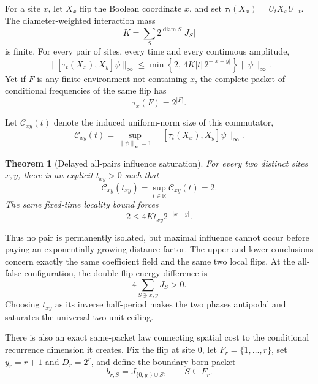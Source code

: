 \documentclass[10pt]{article}
\newtheorem{theorem}{Theorem}
\theoremstyle{definition}
\newcommand{\R}{\mathbb R}
\begin{document}
For a site \(x\), let \(X_x\) flip the Boolean coordinate \(x\), and set
\(\tau_t(X_x)=U_tX_xU_{-t}\). The diameter-weighted interaction mass
\begin{equation}
 K=\sum_S2^{\operatorname{diam}S}|J_S|
 \label{eq:weightedmass}
\end{equation}
is finite. For every pair of sites, every time and every continuous
amplitude,
\begin{equation}
 \bigl\|[\tau_t(X_x),X_y]\psi\bigr\|_\infty
 \le
 \min\!\left\{2,\,
 4K|t|\,2^{-|x-y|}\right\}\|\psi\|_\infty .
 \label{eq:influencecone}
\end{equation}
Yet if \(F\) is any finite environment not containing \(x\), the complete
packet of conditional frequencies of the same flip has
\begin{equation}
 \tau_x(F)=2^{|F|}.
 \label{eq:localfliprank}
\end{equation}

Let \(\mathcal C_{xy}(t)\) denote the induced uniform-norm size of this
commutator,
\[
 \mathcal C_{xy}(t)=
 \sup_{\|\psi\|_\infty=1}
 \bigl\|[\tau_t(X_x),X_y]\psi\bigr\|_\infty .
\]

\begin{theorem}[Delayed all-pairs influence saturation]
For every two distinct sites \(x,y\), there is an explicit \(t_{xy}>0\)
such that
\begin{equation}
 \boxed{\mathcal C_{xy}(t_{xy})=
 \sup_{t\in\R}\mathcal C_{xy}(t)=2.}
 \label{eq:allsaturation}
\end{equation}
The same fixed-time locality bound forces
\begin{equation}
 \boxed{
 2\le
 4K t_{xy}2^{-|x-y|}.}
 \label{eq:saturationdelay}
\end{equation}
\end{theorem}

Thus no pair is permanently isolated, but maximal influence cannot occur
before paying an exponentially growing distance factor. The upper and
lower conclusions concern exactly the same coefficient field and the same
two local flips. At the all-false configuration, the double-flip energy
difference is
\[
 4\sum_{S\ni x,y}J_S>0.
\]
Choosing \(t_{xy}\) as its inverse half-period makes the two phases
antipodal and saturates the universal two-unit ceiling.

There is also an exact same-packet law connecting spatial cost to the
conditional recurrence dimension it creates. Fix the flip at site \(0\),
let \(F_r=\{1,\ldots,r\}\), set \(y_r=r+1\) and \(D_r=2^r\), and define the
boundary-born packet
\begin{equation}
 b_{r,S}=J_{\{0,y_r\}\cup S},
 \qquad S\subseteq F_r.
 \label{eq:boundarypacket}
\end{equation}
\end{document}
